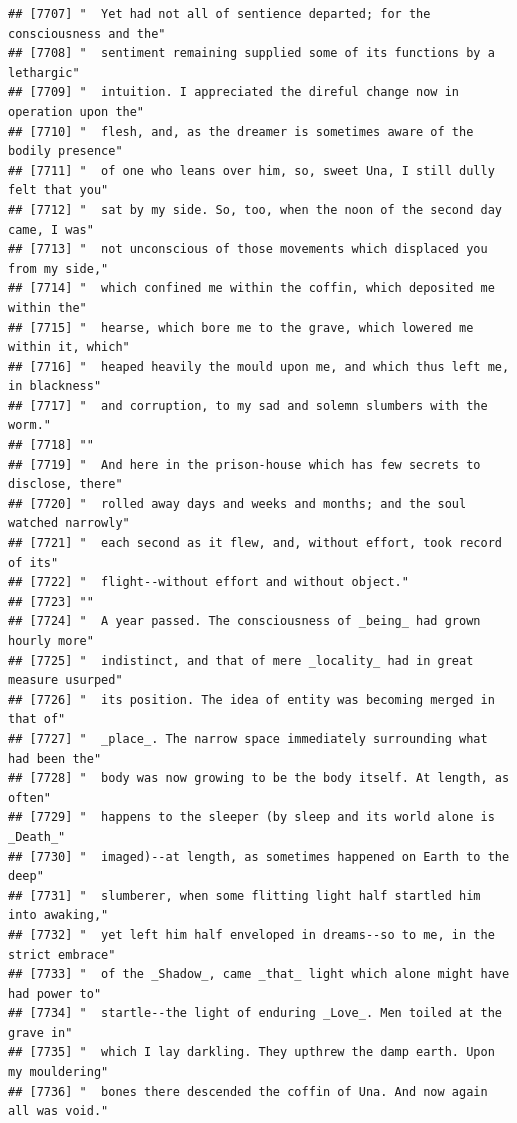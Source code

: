 \documentclass{article}\usepackage[]{graphicx}\usepackage[]{color}
\makeatletter
\newenvironment{kframe}{%
 \def\at@end@of@kframe{}%
 \ifinner\ifhmode%
  \def\at@end@of@kframe{\end{minipage}}%
  \begin{minipage}{\columnwidth}%
 \fi\fi%
 \def\FrameCommand##1{\hskip\@totalleftmargin \hskip-\fboxsep
 \colorbox{shadecolor}{##1}\hskip-\fboxsep
     \hskip-\linewidth \hskip-\@totalleftmargin \hskip\columnwidth}%
 \MakeFramed {\advance\hsize-\width
   \@totalleftmargin\z@ \linewidth\hsize
   \@setminipage}}%
 {\par\unskip\endMakeFramed%
 \at@end@of@kframe}
\newenvironment{knitrout}{}{} %
\makeatother
\begin{document}
\begin{knitrout}
\begin{kframe}
\begin{verbatim}
## [7707] "  Yet had not all of sentience departed; for the consciousness and the"      
## [7708] "  sentiment remaining supplied some of its functions by a lethargic"         
## [7709] "  intuition. I appreciated the direful change now in operation upon the"     
## [7710] "  flesh, and, as the dreamer is sometimes aware of the bodily presence"      
## [7711] "  of one who leans over him, so, sweet Una, I still dully felt that you"     
## [7712] "  sat by my side. So, too, when the noon of the second day came, I was"      
## [7713] "  not unconscious of those movements which displaced you from my side,"      
## [7714] "  which confined me within the coffin, which deposited me within the"        
## [7715] "  hearse, which bore me to the grave, which lowered me within it, which"     
## [7716] "  heaped heavily the mould upon me, and which thus left me, in blackness"    
## [7717] "  and corruption, to my sad and solemn slumbers with the worm."              
## [7718] ""                                                                            
## [7719] "  And here in the prison-house which has few secrets to disclose, there"     
## [7720] "  rolled away days and weeks and months; and the soul watched narrowly"      
## [7721] "  each second as it flew, and, without effort, took record of its"           
## [7722] "  flight--without effort and without object."                                
## [7723] ""                                                                            
## [7724] "  A year passed. The consciousness of _being_ had grown hourly more"         
## [7725] "  indistinct, and that of mere _locality_ had in great measure usurped"      
## [7726] "  its position. The idea of entity was becoming merged in that of"           
## [7727] "  _place_. The narrow space immediately surrounding what had been the"       
## [7728] "  body was now growing to be the body itself. At length, as often"           
## [7729] "  happens to the sleeper (by sleep and its world alone is _Death_"           
## [7730] "  imaged)--at length, as sometimes happened on Earth to the deep"            
## [7731] "  slumberer, when some flitting light half startled him into awaking,"       
## [7732] "  yet left him half enveloped in dreams--so to me, in the strict embrace"    
## [7733] "  of the _Shadow_, came _that_ light which alone might have had power to"    
## [7734] "  startle--the light of enduring _Love_. Men toiled at the grave in"         
## [7735] "  which I lay darkling. They upthrew the damp earth. Upon my mouldering"     
## [7736] "  bones there descended the coffin of Una. And now again all was void."      

\end{verbatim}
\end{kframe}
\end{knitrout}
\end{document}
